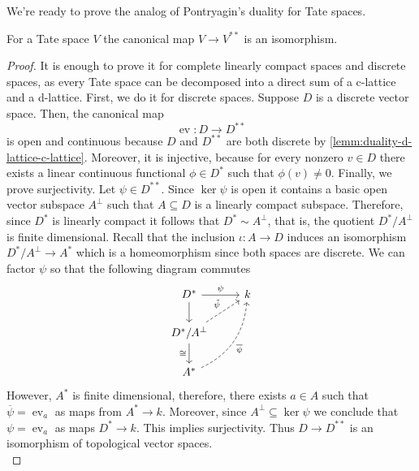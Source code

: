 We're ready to prove the analog of Pontryagin's duality for Tate spaces.
\begin{theorem}\label{thm:self-duality}
	For a Tate space $V$ the canonical map $V \to V^{**}$ is an isomorphism.
\end{theorem}
\begin{proof}
	It is enough to prove it for complete linearly compact spaces and discrete spaces, as every Tate space can be decomposed into a direct sum of a c-lattice and a d-lattice. First, we do it for discrete spaces. Suppose $D$ is a discrete vector space. Then, the canonical map
	\[
		\operatorname{ev}\colon D \to D^{**}
	\]
	is open and continuous because $D$ and $D^{**}$ are both discrete by \cref{lemm:duality-d-lattice-c-lattice}. Moreover, it is injective, because for every nonzero $v \in D$ there exists a linear continuous functional $\phi\in D^{*}$ such that $\phi(v)\neq 0$. Finally, we prove surjectivity. Let $\psi \in D^{**}$. Since $\ker \psi$ is open it contains a basic open vector subspace $A^{\perp}$ such that $A \subseteq D$ is a linearly compact subspace. Therefore, since $D^{*}$ is linearly compact it follows that $D^{*} \sim A^{\perp}$, that is, the quotient $D^{*}/A^{\perp}$ is finite dimensional. Recall that the inclusion $\iota\colon A \to D$ induces an isomorphism $D^{*}/A^{\perp} \to A^{*}$ which is a homeomorphism since both spaces are discrete. We can factor $\psi$ so that the following diagram commutes
	\[
	\begin{tikzcd}
		D^{*} \arrow[r, "\psi"] \arrow[d] & k \\
		D^{*}/A^{\perp} \arrow[ru, dashed, "\tilde{\psi}"] \arrow[d, swap, "\cong"] & \\
		A^{*} \arrow[ruu, dashed, swap, bend right, "\overline{\psi}"]
	\end{tikzcd}
	\]
	However, $A^{*}$ is finite dimensional, therefore, there exists $a \in A$ such that $\overline{\psi} = \operatorname{ev}_{a}$ as maps from $A^{*}\to k$. Moreover, since $A^{\perp} \subseteq \ker\psi$ we conclude that $\psi = \operatorname{ev}_{a}$ as maps $D^{*} \to k$. This implies surjectivity. Thus $D \to D^{**}$ is an isomorphism of topological vector spaces. \\


\end{proof}
